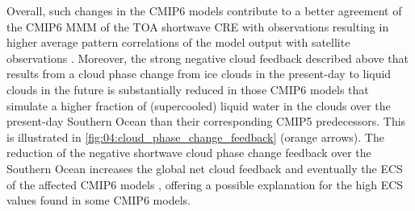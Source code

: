 Overall, such changes in the \acs{CMIP}6 models contribute to a better
agreement of the \acs{CMIP}6 \ac{MMM} of the \ac{TOA} shortwave \ac{CRE} with
observations resulting in higher average pattern correlations of the model
output with satellite observations \autocite{Bock2020}. Moreover, the strong
negative cloud feedback described above that results from a cloud phase change
from ice clouds in the present-day to liquid clouds in the future is
substantially reduced in those \acs{CMIP}6 models that simulate a higher
fraction of (supercooled) liquid water in the clouds over the present-day
Southern Ocean than their corresponding \acs{CMIP}5 predecessors. This is
illustrated in \cref{fig:04:cloud_phase_change_feedback} (orange arrows). The
reduction of the negative shortwave cloud phase change feedback over the
Southern Ocean increases the global net cloud feedback
\autocite{BodasSalcedo2019, Tan2016} and eventually the \ac{ECS} of the
affected \acs{CMIP}6 models \autocite{Andrews2019, Gettelman2019}, offering a
possible explanation for the high \ac{ECS} values found in some \acs{CMIP}6
models.

